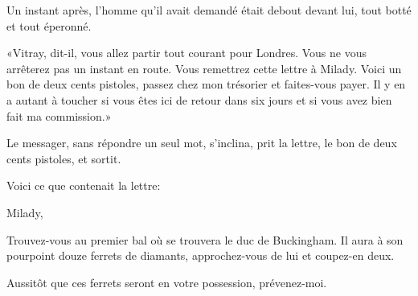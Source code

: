 Un instant après, l'homme qu'il avait demandé était debout devant lui, tout botté et tout éperonné. 

«Vitray, dit-il, vous allez partir tout courant pour Londres. Vous ne vous arrêterez pas un instant en route. Vous remettrez cette lettre à Milady. Voici un bon de deux cents pistoles, passez chez mon trésorier et faites-vous payer. Il y en a autant à toucher si vous êtes ici de retour dans six jours et si vous avez bien fait ma commission.» 

Le messager, sans répondre un seul mot, s'inclina, prit la lettre, le bon de deux cents pistoles, et sortit. 

Voici ce que contenait la lettre:  

\begin{mail}{}{Milady, }

Trouvez-vous au premier bal où se trouvera le duc de Buckingham. Il aura à son pourpoint douze ferrets de diamants, approchez-vous de lui et coupez-en deux. 

Aussitôt que ces ferrets seront en votre possession, prévenez-moi.
\end{mail}